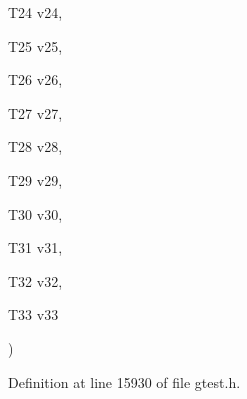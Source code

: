 {{\begin{DoxyParamCaption}
\item[{\-T24}]{v24, }
\item[{\-T25}]{v25, }
\item[{\-T26}]{v26, }
\item[{\-T27}]{v27, }
\item[{\-T28}]{v28, }
\item[{\-T29}]{v29, }
\item[{\-T30}]{v30, }
\item[{\-T31}]{v31, }
\item[{\-T32}]{v32, }
\item[{\-T33}]{v33}
\end{DoxyParamCaption}
)}}\label{d0/d75/namespacetesting_ac972228f2ff86974ab6591a10512326a}


\-Definition at line 15930 of file gtest.\-h.


